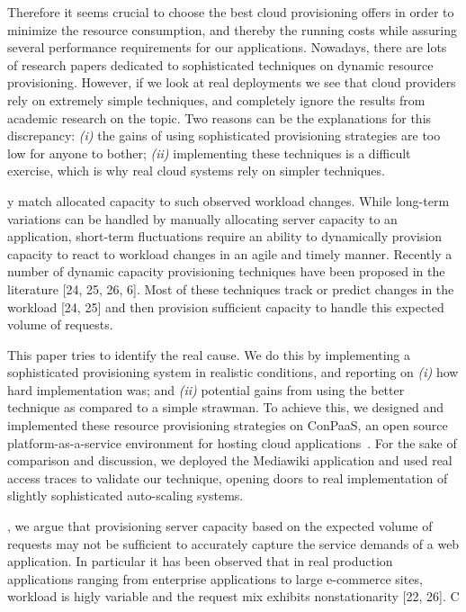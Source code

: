 Therefore it seems crucial to choose the best cloud provisioning offers in order to minimize the resource consumption, and thereby the running costs while assuring several performance requirements for our applications. Nowadays, there are lots of research papers dedicated to sophisticated techniques on dynamic resource provisioning. However, if we look at real deployments we see that cloud providers rely on extremely simple techniques, and completely ignore the results from academic research on the topic. Two reasons can be the explanations for this discrepancy: \emph{(i)} the gains of using sophisticated provisioning strategies are too low for anyone to bother; \emph{(ii)}  implementing these techniques is a difficult exercise, which is why real cloud systems rely on simpler techniques.

y match allocated capacity to such
observed workload changes. While long-term variations can be
handled by manually allocating server capacity to an application,
short-term ﬂuctuations require an ability to dynamically provision
capacity to react to workload changes in an agile and timely manner. Recently a number of dynamic capacity provisioning techniques have been proposed in the literature [24, 25, 26, 6]. Most
of these techniques track or predict changes in the workload [24,
25] and then provision sufﬁcient capacity to handle this expected
volume of requests.


This paper tries to identify the real cause. We do this by implementing a sophisticated provisioning system in realistic conditions, and reporting on \emph{(i)} how hard implementation was; and \emph{(ii)} potential gains from using the better technique as compared to a simple strawman. To achieve this, we designed and implemented these resource provisioning strategies on ConPaaS, an open source platform-as-a-service environment for hosting cloud applications~\cite{conpaasIC}. For the sake of comparison and discussion, we deployed the Mediawiki application and used real access traces to validate our technique, opening doors to real implementation of slightly sophisticated auto-scaling systems.


, we argue that provisioning server capacity based on
the expected volume of requests may not be sufﬁcient to accurately
capture the service demands of a web application. In particular
it has been observed that in real production applications ranging
from enterprise applications to large e-commerce sites, workload
is higly variable and the request mix exhibits nonstationarity [22,
26]. C

